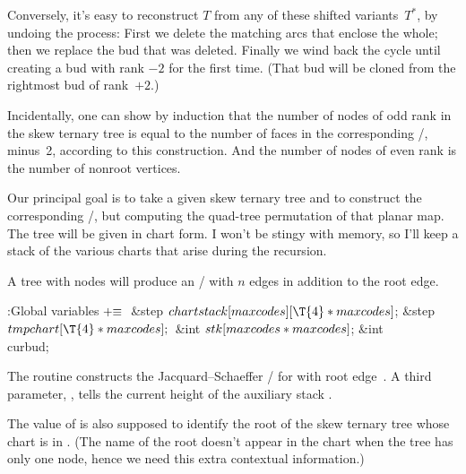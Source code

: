Conversely, it's easy to reconstruct $T$ from any of these
shifted variants~$T^*$, by undoing the process: First we delete the
matching arcs that enclose the whole; then we replace the bud that
was deleted. Finally we wind back the cycle until creating a
bud with rank $-2$ for the first time. (That bud
will be cloned from the rightmost bud of rank~$+2$.)

Incidentally, one can show by induction that the number of nodes of odd rank
in the skew ternary tree is equal to the number of faces in the corresponding
\RNBPM/, minus~2, according to this construction.
And the number of nodes of even rank is the number of
nonroot vertices.

\fi

Our principal goal is to take a given skew ternary tree and to
construct the corresponding \RNBPM/, but computing the quad-tree
permutation of that planar map. The tree will be given in
chart form. I won't be stingy with memory, so I'll keep a stack
of the various charts that arise during the recursion.

A tree with  nodes will produce an \RNBPM/ with $n$ edges
in addition to the root edge.

\Y\B\4:Global variables\X${}\mathrel+\equiv{}$\6
\&{step} ${}\\{chartstack}[\\{maxcodes}][\T{4}*\\{maxcodes}]{}$;\6
\&{step} ${}\\{tmpchart}[\T{4}*\\{maxcodes}];{}$\6
\&{int} ${}\\{stk}[\\{maxcodes}*\\{maxcodes}]{}$;\6
\&{int} \\{curbud};\par
\fi

 The  routine constructs the Jacquard--Schaeffer
\RNBPM/ for 
with root edge~. A third parameter, , tells the current height
of the
auxiliary stack .

The value of  is also supposed to identify
the root of the skew ternary tree whose chart is in .
(The name of the root doesn't appear in the chart when the tree has
only one node, hence we need this extra contextual information.)

